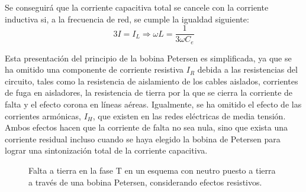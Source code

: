             Se conseguirá que la corriente capacitiva total se cancele con la corriente inductiva si, a la frecuencia de red, se cumple la igualdad siguiente:
            \begin{equation}
                3I=I_\textit{L}\Rightarrow\omega L =\dfrac{1}{3\omega C_\textit{e}}
            \end{equation}

            Esta presentación del principio de la bobina Petersen es simplificada, ya que se ha omitido una componente de corriente resistiva $I_\textit{R}$ debida a las resistencias del circuito, tales como la resistencia de aislamiento de los cables aislados, corrientes de fuga en aisladores, la resistencia de tierra por la que se cierra la corriente de falta y el efecto corona en líneas aéreas. Igualmente, se ha omitido el efecto de las corrientes armónicas, $I_\textit{H}$, que existen en las redes eléctricas de media tensión. Ambos efectos hacen que la corriente de falta no sea nula, sino que exista una corriente residual incluso cuando se haya elegido la bobina de Petersen para lograr una sintonización total de la corriente capacitiva.
            
            \begin{figure}[H]
                \centering
                \caption{Falta a tierra en la fase T en un esquema con neutro puesto a tierra a través de una bobina Petersen, considerando efectos resistivos.}
            \end{figure}

